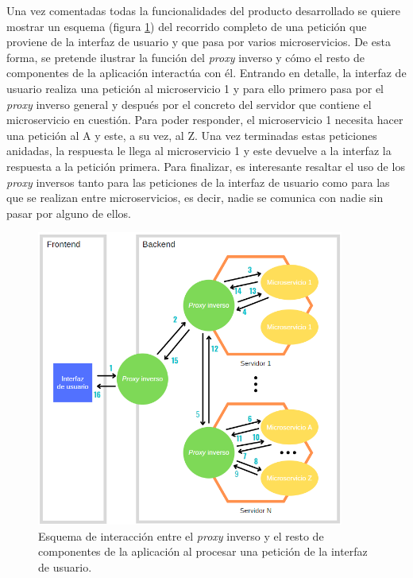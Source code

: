 \documentclass[11pt,spanish,listoffigures]{tfgetsinf}
\begin{document}
Una vez comentadas todas la funcionalidades del producto desarrollado se quiere mostrar un esquema (figura \ref{esquemaInteraccionProxyInverso}) del recorrido completo de una petición que proviene de la interfaz de usuario y que pasa por varios microservicios. De esta forma, se pretende ilustrar la función del \emph{proxy} inverso y cómo el resto de componentes de la aplicación interactúa con él. Entrando en detalle, la interfaz de usuario realiza una petición al microservicio 1 y para ello primero pasa por el \emph{proxy} inverso general y después por el concreto del servidor que contiene el microservicio en cuestión. Para poder responder, el microservicio 1 necesita hacer una petición al A y este, a su vez, al Z. Una vez terminadas estas peticiones anidadas, la respuesta le llega al microservicio 1 y este devuelve a la interfaz la respuesta a la petición primera. Para finalizar, es interesante resaltar el uso de los \emph{proxy} inversos tanto para las peticiones de la interfaz de usuario como para las que se realizan entre microservicios, es decir, nadie se comunica con nadie sin pasar por alguno de ellos.

\begin{figure}[ht]
\centering
\includegraphics[width=0.9\textwidth]{imagenes/esquemaInteraccionProxyInverso}
\caption{Esquema de interacción entre el \emph{proxy} inverso y el resto de componentes de la aplicación al procesar una petición de la interfaz de usuario.}
	\label{esquemaInteraccionProxyInverso}
\end{figure}
\end{document}
